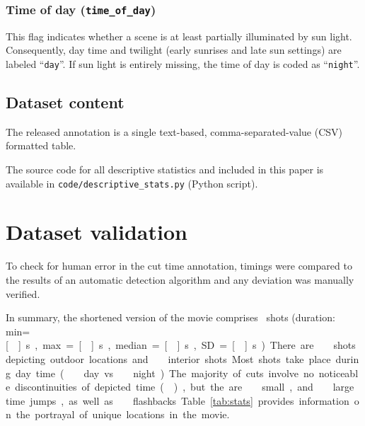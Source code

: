 \documentclass[10pt,a4paper]{article}
\begin{document}
\begin{multicols}{2}
\subsubsection*{Time of day (\texttt{time\_of\_day})}

This flag indicates whether a scene is at least partially illuminated by sun
light. Consequently, day time and twilight (early sunrises and late sun
settings) are labeled ``\texttt{day}''. If sun light is entirely missing,
the time of day is coded as ``\texttt{night}''.



\subsection*{Dataset content}

The released annotation is a single text-based, comma-separated-value (CSV)
formatted table.

The source code for all descriptive statistics and included in this paper is
available in \texttt{code/descriptive\_stats.py} (Python script).


\section*{Dataset validation}

To check for human error in the cut time annotation, timings were compared to
the results of an automatic detection algorithm and any deviation was manually
verified.

In summary, the shortened version of the movie comprises \NShots\ shots
(duration: min=\unit[\ShotLengthMin]{s}, max=\unit[\ShotLengthMax]{s},
median=\unit[\ShotLengthMedian]{s}, SD=\unit[\ShotLengthSD]{s}). There are
\NExteriorShots\ shots depicting outdoor locations and \NInteriorShots\
interior shots. Most shots take place during day time (\NDayShots\ day
vs.~\NNightShots\ night). The majority of cuts involve no
noticeable discontinuities of depicted time (\NShotsTimeNoJump), but the are
\NShotsTimeSmallJump\ small, and \NShotsTimeLargeJump\ large time jumps, as
well as \NShotsTimeFlashback\ flashbacks.

Table \ref{tab:stats} provides information on the portrayal of unique locations
in the movie.



\end{multicols}
\end{document}
